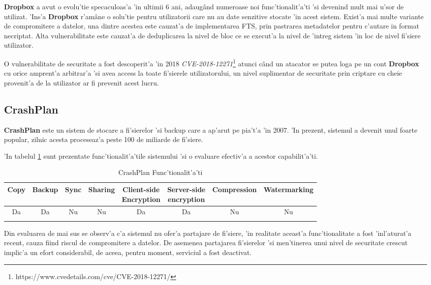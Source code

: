 \documentclass[12pt,a4paper,twoside]{report}
\newcommand{\greencheck}{\color{green}  \ding{51}}
\newcommand{\redxmark}{\color{red} \ding{55}}
\begin{document}
\textbf{Dropbox} a avut o evolu'tie specaculoas'a 'in ultimii 6  ani, adaugând numeroase noi func'tionalit'a'ti 'si devenind mult mai u'sor de utilizat. 'Ins'a \textbf{Dropbox} r'amâne o solu'tie pentru utilizatorii care nu au date senzitive stocate 'in acest sistem. Exist'a mai multe variante de compromitere a datelor, una dintre acestea este cauzat'a de implementarea FTS, prin pastrarea metadatelor pentru c'autare in format necriptat. Alta vulnerabilitate este cauzat'a de deduplicarea la nivel de bloc ce se execut'a la nivel de 'intreg sistem 'in loc de nivel fi'siere utilizator.

O vulnerabilitate de securitate a fost descoperit'a 'in 2018  {\it CVE-2018-12271}\footnote{https://www.cvedetails.com/cve/CVE-2018-12271/} atunci când un atacator se putea loga pe un cont \textbf{Dropbox} cu orice amprent'a arbitrar'a  'si avea access la toate fi'sierele  utilizatorului, un nivel suplimentar de securitate prin criptare cu cheie provenit'a de la utilizator ar fi prevenit acest lucru.


\subsection{CrashPlan}
\textbf{CrashPlan} este un sistem de stocare a fi'sierelor 'si backup care a ap'arut pe pia't'a 'in 2007. 'In prezent, sistemul a devenit unul foarte popular, zilnic acesta proceseaz'a peste 100 de miliarde de fi'siere. 

'In tabelul \ref{table:crashplanfeaturetable} sunt prezentate func'tionalit'a'tile sistemului 'si o evaluare efectiv'a a acestor capabilit'a'ti.
\begin{table}[H]
\small

\centering
\caption{CrashPlan Func'tionalit'a'ti}
\begin{tabular}{|c|c|c|c|c|c|c|c|}          
\hline               
Copy & Backup & Sync & Sharing & \makecell{Client-side\\ Encryption} & \makecell{Server-side \\ encryption} & Compression & Watermarking \\ [0.5ex]   
\hline 
Da & Da & Nu & Nu & Da &  Da  & Nu & Nu    \\                      
\greencheck & \greencheck & \redxmark\redxmark & \redxmark\redxmark & \greencheck\greencheck & \greencheck\greencheck &  \redxmark\redxmark &  \redxmark\redxmark  \\               
\hline                              
\end{tabular}
\label{table:crashplanfeaturetable}             
\end{table}
Din evaluarea de mai sus se observ'a c'a sistemul nu ofer'a partajare de fi'siere, 'in realitate aceast'a func'tionalitate a fost 'inl'aturat'a recent, cauza fiind riscul de compromitere a datelor. De asemenea partajarea fi'sierelor 'si men'tinerea unui nivel de securitate crescut implic'a un efort considerabil, de aceea, pentru moment, serviciul a fost deactivat.
\end{document}
